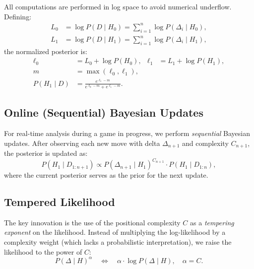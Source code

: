 \documentclass[11pt,a4paper]{article}
\begin{document}
All computations are performed in log space to avoid numerical underflow.
Defining:
\begin{align}
    L_0 &= \log P(D \mid H_0) = \sum_{i=1}^{n} \log P(\Delta_i \mid H_0),
    \label{eq:log_lik_human}\\
    L_1 &= \log P(D \mid H_1) = \sum_{i=1}^{n} \log P(\Delta_i \mid H_1),
    \label{eq:log_lik_cheater}
\end{align}
the normalized posterior is:
\begin{align}
    \ell_0 &= L_0 + \log P(H_0), &
    \ell_1 &= L_1 + \log P(H_1), \nonumber\\
    m &= \max(\ell_0, \ell_1), \label{eq:logsumexp}\\
    P(H_1 \mid D) &= \frac{e^{\ell_1 - m}}{e^{\ell_0 - m} + e^{\ell_1 - m}}.
    \label{eq:posterior_normalized}
\end{align}

\subsection{Online (Sequential) Bayesian Updates}

For real-time analysis during a game in progress, we perform \emph{sequential}
Bayesian updates. After observing each new move with delta $\Delta_{n+1}$ and
complexity $C_{n+1}$, the posterior is updated as:
\begin{equation}
    P(H_1 \mid D_{1:n+1}) \propto P(\Delta_{n+1} \mid H_1)^{C_{n+1}} \cdot
    P(H_1 \mid D_{1:n}),
    \label{eq:sequential_update}
\end{equation}
where the current posterior serves as the prior for the next update.

\subsection{Tempered Likelihood}
\label{sec:tempered}

The key innovation is the use of the positional complexity $C$ as a
\emph{tempering exponent} on the likelihood. Instead of multiplying the
log-likelihood by a complexity weight (which lacks a probabilistic
interpretation), we raise the likelihood to the power of $C$:
\begin{equation}
    P(\Delta \mid H)^{\alpha} \quad \Longleftrightarrow \quad
    \alpha \cdot \log P(\Delta \mid H), \quad \alpha = C.
    \label{eq:tempering}
\end{equation}
\end{document}

